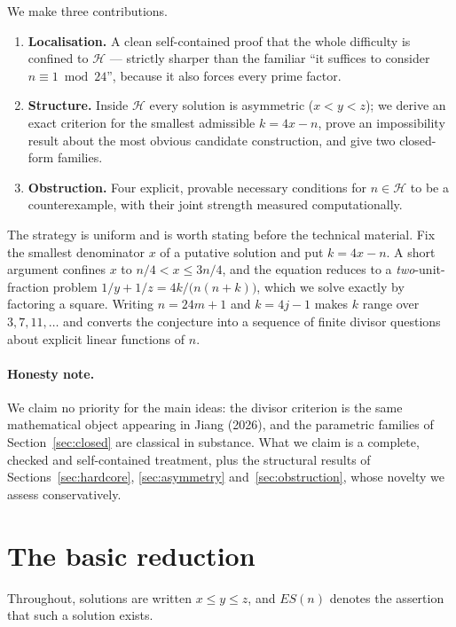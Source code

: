 \documentclass[11pt,a4paper]{article}
\theoremstyle{definition}
\begin{document}
We make three contributions.

\begin{enumerate}
\item \textbf{Localisation.} A clean self-contained proof that the whole
  difficulty is confined to $\mathcal H$ --- strictly sharper than the familiar
  ``it suffices to consider $n\equiv 1 \bmod 24$'', because it also forces
  every prime factor.
\item \textbf{Structure.} Inside $\mathcal H$ every solution is asymmetric
  ($x<y<z$); we derive an exact criterion for the smallest admissible
  $k=4x-n$, prove an impossibility result about the most obvious candidate
  construction, and give two closed-form families.
\item \textbf{Obstruction.} Four explicit, provable necessary conditions for
  $n\in\mathcal H$ to be a counterexample, with their joint strength measured
  computationally.
\end{enumerate}

The strategy is uniform and is worth stating before the technical material.
Fix the smallest denominator $x$ of a putative solution and put $k=4x-n$. A
short argument confines $x$ to $n/4<x\le 3n/4$, and the equation reduces to a
\emph{two}-unit-fraction problem $1/y+1/z=4k/\bigl(n(n+k)\bigr)$, which we solve
exactly by factoring a square. Writing $n=24m+1$ and $k=4j-1$ makes $k$ range
over $3,7,11,\dots$ and converts the conjecture into a sequence of finite divisor
questions about explicit linear functions of $n$.

\paragraph{Honesty note.} We claim no priority for the main ideas: the divisor
criterion is the same mathematical object appearing in Jiang (2026), and the
parametric families of Section~\ref{sec:closed} are classical in substance. What
we claim is a complete, checked and self-contained treatment, plus the
structural results of Sections~\ref{sec:hardcore},
\ref{sec:asymmetry} and~\ref{sec:obstruction}, whose novelty we assess
conservatively.

\section{The basic reduction}\label{sec:basic}

Throughout, solutions are written $x\le y\le z$, and $ES(n)$ denotes the
assertion that such a solution exists.
\end{document}
